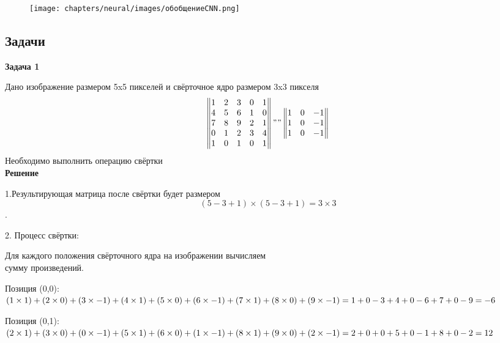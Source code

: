 \begin{description}
\begin{figure}[h]

\centering

\texttt{[image: chapters/neural/images/обобщениеCNN.png]}

\label{fig:cnn_generalization}

\end{figure}

\subsection{Задачи}
\textbf{Задача 1}

Дано изображение размером 5x5 пикселей и свёрточное ядро размером 3x3 пикселя\\

\begin{equation*}
\begin{Vmatrix}
1 & 2 & 3 & 0 & 1\\
4 & 5 & 6 & 1 & 0\\
7 & 8 & 9 & 2 & 1\\
0 & 1 & 2 & 3 & 4\\
1 & 0 & 1 & 0 & 1
\end{Vmatrix}
""
\begin{Vmatrix}
1 & 0 & -1\\
1 & 0 & -1\\
1 & 0 & -1
\end{Vmatrix}
\end{equation*}
Необходимо выполнить операцию свёртки\\
\textbf{Решение}

1.Результирующая матрица после свёртки будет размером
$$ (5-3+1) \times (5-3+1) = 3 \times 3 $$.

2. Процесс свёртки:

Для каждого положения свёрточного ядра на изображении вычисляем\\
сумму произведений.

Позиция (0,0):
$
(1 \times 1) + (2 \times 0) + (3 \times -1) + \\
(4 \times 1) + (5 \times 0) + (6 \times -1) + \\
(7 \times 1) + (8 \times 0) + (9 \times -1) = \\
1 + 0 - 3 + 4 + 0 - 6 + 7 + 0 - 9 = -6
$

 Позиция (0,1):
$
(2 \times 1) + (3 \times 0) + (0 \times -1) + \\
(5 \times 1) + (6 \times 0) + (1 \times -1) + \\
(8 \times 1) + (9 \times 0) + (2 \times -1) = \\
2 + 0 + 0 + 5 + 0 - 1 + 8 + 0 - 2 = 12
$


\end{description}
